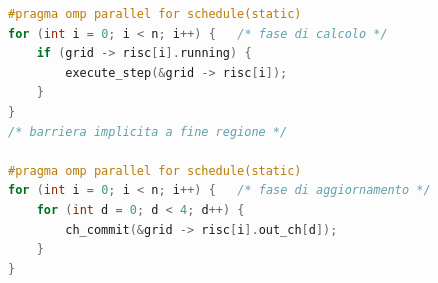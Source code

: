 \begin{lstlisting}[caption={Le due regioni parallele con cui il simulatore esegue un ciclo di clock},label={lst:omp},language=C,float=htbp]
#pragma omp parallel for schedule(static)
for (int i = 0; i < n; i++) {   /* fase di calcolo */
    if (grid -> risc[i].running) {
        execute_step(&grid -> risc[i]);
    }
}
/* barriera implicita a fine regione */

#pragma omp parallel for schedule(static)
for (int i = 0; i < n; i++) {   /* fase di aggiornamento */
    for (int d = 0; d < 4; d++) {
        ch_commit(&grid -> risc[i].out_ch[d]);
    }
}
\end{lstlisting}